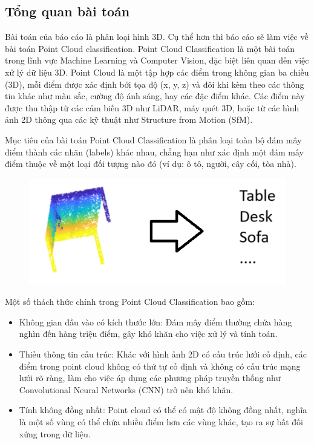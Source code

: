 \subsection{Tổng quan bài toán}
Bài toán của báo cáo là phân loại hình 3D. Cụ thể hơn thì báo cáo sẽ làm việc về bài toán Point Cloud classification. Point Cloud Classification là một bài toán trong lĩnh vực Machine Learning và Computer Vision, đặc biệt liên quan đến việc xử lý dữ liệu 3D. Point Cloud là một tập hợp các điểm trong không gian ba chiều (3D), mỗi điểm được xác định bởi tọa độ (x, y, z) và đôi khi kèm theo các thông tin khác như màu sắc, cường độ ánh sáng, hay các đặc điểm khác. Các điểm này được thu thập từ các cảm biến 3D như LiDAR, máy quét 3D, hoặc từ các hình ảnh 2D thông qua các kỹ thuật như Structure from Motion (SfM).

Mục tiêu của bài toán Point Cloud Classification là phân loại toàn bộ đám mây điểm thành các nhãn (labels) khác nhau, chẳng hạn như xác định một đám mây điểm thuộc về một loại đối tượng nào đó (ví dụ: ô tô, người, cây cối, tòa nhà).

\begin{figure}[H]
    \centering
    \includegraphics[width=0.7\linewidth]{Images/tong_quan_bt.png}
\end{figure}

Một số thách thức chính trong Point Cloud Classification bao gồm:
\begin{itemize}
    \item Không gian đầu vào có kích thước lớn: Đám mây điểm thường chứa hàng nghìn đến hàng triệu điểm, gây khó khăn cho việc xử lý và tính toán.

    \item Thiếu thông tin cấu trúc: Khác với hình ảnh 2D có cấu trúc lưới cố định, các điểm trong point cloud không có thứ tự cố định và không có cấu trúc mạng lưới rõ ràng, làm cho việc áp dụng các phương pháp truyền thống như Convolutional Neural Networks (CNN) trở nên khó khăn.

    \item Tính không đồng nhất: Point cloud có thể có mật độ không đồng nhất, nghĩa là một số vùng có thể chứa nhiều điểm hơn các vùng khác, tạo ra sự bất đối xứng trong dữ liệu.

\end{itemize}


